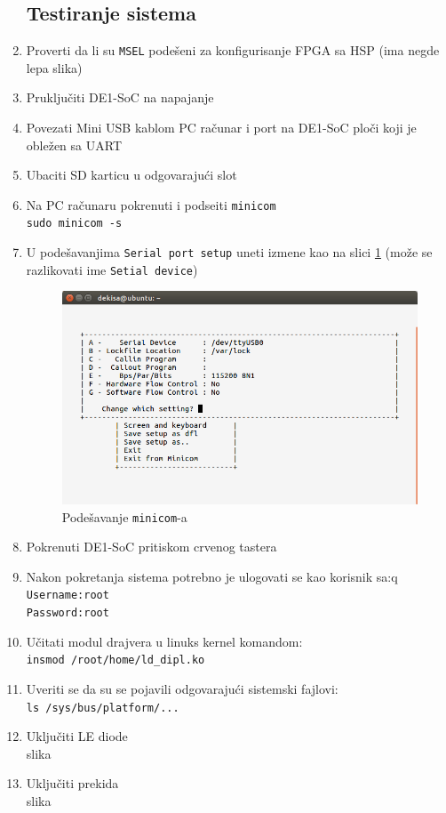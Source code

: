 \begin{enumerate}
\subsection{Testiranje sistema}
\item Proverti da li su \texttt{MSEL} podešeni za konfigurisanje FPGA sa HSP (ima negde lepa slika)
\item Pruključiti DE1-SoC na napajanje
\item Povezati Mini USB kablom PC računar i port na DE1-SoC ploči koji je obležen sa UART
\item Ubaciti SD karticu u odgovarajući slot
\item Na PC računaru pokrenuti i podseiti \texttt{minicom}\\
\texttt{sudo minicom -s}
\item U podešavanjima \texttt{Serial port setup} uneti izmene kao na slici \ref{slika:minicom} (može se razlikovati ime \texttt{Setial device})
\begin{figure}[h!]
\centering
\includegraphics[scale=0.6,trim={0 15 10 60},clip]{img/minicom.png}
\caption{Podešavanje \texttt{minicom}-a}
\label{slika:minicom}
\end{figure}
\item Pokrenuti DE1-SoC pritiskom crvenog tastera
\item Nakon pokretanja sistema potrebno je ulogovati se kao korisnik sa:q\\
\texttt{Username:root\\
Password:root}
\item Učitati modul drajvera u linuks kernel komandom:\\
\texttt{insmod /root/home/ld\_dipl.ko}
\item Uveriti se da su se pojavili odgovarajući sistemski fajlovi:\\
\texttt{ls /sys/bus/platform/...}
\item Uključiti LE diode\\slika
\item Uključiti prekida\\slika


\end{enumerate}